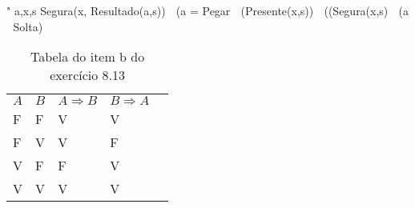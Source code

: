 \documentclass[12pt,letterpaper]{article}
\begin{document}
	" a,x,s Segura(x, Resultado(a,s))  (a = Pegar  (Presente(x,s))
	 ((Segura(x,s)  (a  Solta)
	
	
	
	
	
	\newpage 
	
	\begin{table}[]
		\centering
		\caption{Tabela do item b do exercício 8.13}
		\label{my-label}
		\begin{tabular}{|l|l|l|l|l}
			\cline{1-4}
			$A$ & $B$ & $A \Rightarrow B$ & $B \Rightarrow A$ &  \\ \cline{1-4}
			F   & F   & V                 & V                 &  \\ \cline{1-4}
			F   & V   & V                 & F                 &  \\ \cline{1-4}
			V   & F   & F                 & V                 &  \\ \cline{1-4}
			V   & V   & V                 & V                 &  \\ \cline{1-4}
		\end{tabular}
	\end{table}
			 
\end{document}

